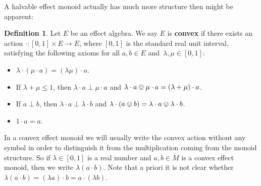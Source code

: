 \documentclass[10pt,conference]{IEEEtran}
\newcommand{\cl}{\overline}
\newcommand\Define[1]{\textbf{#1}}
\newcounter{counter}
\theoremstyle{definition}
\newtheorem{proposition}[counter]{Proposition}
\newtheorem{definition}[counter]{Definition}
\begin{document}
A halvable effect monoid actually has much more structure then might be apparent:
\begin{definition}\label{def:convexeffectalgebra}
    Let $E$ be an effect algebra. We say $E$ is \Define{convex} if
    there exists an action $\cdot: [0,1]\times E\rightarrow E$,
    where $[0,1]$ is the standard real unit interval, satisfying
    the following axioms for all $a,b\in E$ and~$\lambda, \mu \in
    [0,1]$:
    \begin{itemize}
        \item $\lambda\cdot (\mu\cdot a) = (\lambda\mu)\cdot a$.
    \item If $\lambda+\mu \leq 1$, then $\lambda \cdot a \perp
    \mu \cdot a$ and $\lambda \cdot a \ovee \mu \cdot a =
    (\lambda+\mu)\cdot a$.
        \item If $a\perp b$, then $\lambda\cdot a \perp \lambda \cdot b$ and $\lambda\cdot(a\ovee b) = \lambda\cdot a \ovee \lambda \cdot b$.
        \item $1\cdot a = a$.
    \end{itemize}
\end{definition}

In a convex effect monoid we will usually write
the convex action without any symbol in order to distinguish it 
from the multiplication coming from the monoid structure. 
So if $\lambda \in [0,1]$ is a real number and $a,b \in M$ is 
a convex effect monoid, then we write $\lambda(a\cdot b)$. 
Note that a priori it is not clear whether 
$\lambda (a\cdot b) = (\lambda a)\cdot b
    =   a \cdot (\lambda b)$.


    
\end{document}
